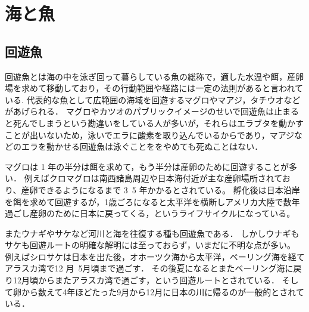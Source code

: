 \documentclass[12pt,a4j,titlepage]{ltjsarticle}
\begin{document}
\section{海と魚}\label{海と魚}
\subsection{回遊魚}
回遊魚とは海の中を泳ぎ回って暮らしている魚の総称で，適した水温や餌，産卵場を求めて移動しており，その行動範囲や経路には一定の法則があると言われている\cite{kairyuu}.
代表的な魚として広範囲の海域を回遊するマグロやマアジ，タチウオなどがあげられる．
マグロやカツオのパブリックイメージのせいで回遊魚は止まると死んでしまうという勘違いをしている人が多いが，それらはエラブタを動かすことが出いないため，泳いでエラに酸素を取り込んでいるからであり，マアジなどのエラを動かせる回遊魚は泳ぐことををやめても死ぬことはない．\par
マグロは 1 年の半分は餌を求めて，もう半分は産卵のために回遊することが多い．
例えばクロマグロは南西諸島周辺や日本海付近が主な産卵場所されており、産卵できるようになるまで 3~5 年かかるとされている。
孵化後は日本沿岸を餌を求めて回遊するが，1歳ごろになると太平洋を横断しアメリカ大陸で数年過ごし産卵のために日本に戻ってくる，というライフサイクルになっている。\par
またウナギやサケなど河川と海を往復する種も回遊魚である．
しかしウナギもサケも回遊ルートの明確な解明には至っておらず，いまだに不明な点が多い。
例えばシロサケは日本を出た後，オホーツク海から太平洋，ベーリング海を経てアラスカ湾で12 月~5月頃まで過ごす．
その後夏になるとまたベーリング海に戻り12月頃からまたアラスカ湾で過ごす，という回遊ルートとされている．
そして卵から数えて4年ほどたった9月から12月に日本の川に帰るのが一般的とされている．
\end{document}
